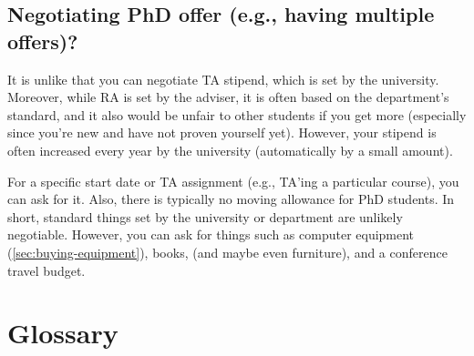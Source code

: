 \documentclass[oneside,11pt,dvipsnames]{book}
\def\sectioninfo#1{%
  \addcontentsline{toc}{sectioninfo}{%
    \noexpand\numberline{}\color{black}{#1}}%
}
\begin{document}
\section{Negotiating PhD offer (e.g., having multiple offers)?}\label{sec:negotiate}
\sectioninfo{You will not be able to negotiate stipend, but you can ask for specific start date, TA assignment, and conference travel budget.}

It is unlike that you can negotiate TA stipend, which is set by the university. Moreover, while RA is set by the adviser, it is often based on the department's standard, and it also would be unfair to other students if you get more (especially since you're new and have not proven yourself yet). However, your stipend is often increased every year by the university (automatically by a small amount).

For a specific start date or TA assignment (e.g., TA'ing a particular course), you can ask for it. Also, there is typically no moving allowance for PhD students. In short, standard things set by the university or department are unlikely negotiable.  However, you can ask for things such as computer equipment (\autoref{sec:buying-equipment}), books, (and maybe even furniture), and a conference travel budget.



\appendix
\chapter{Glossary}\label{sec:glossary}
\end{document}
